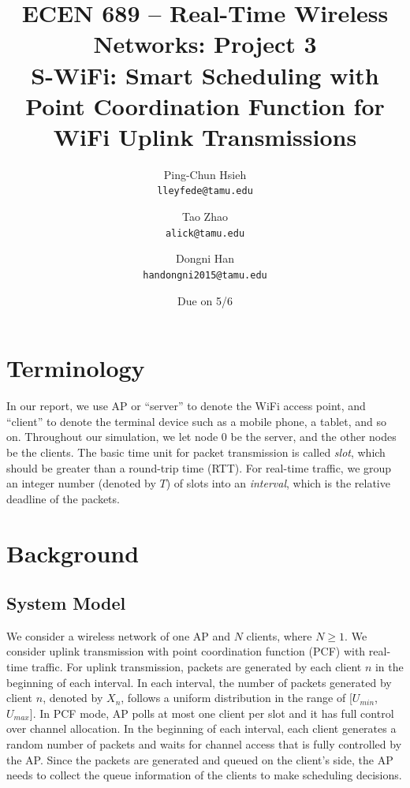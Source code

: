 \documentclass{article}
\begin{document}
\title{\bfseries ECEN 689 -- Real-Time Wireless Networks: Project 3\\
S-WiFi: Smart Scheduling with Point Coordination Function for WiFi Uplink Transmissions}
\date{Due on 5/6}
\author{%
Ping-Chun Hsieh\\
\texttt{lleyfede@tamu.edu}
\and
Tao Zhao\\
\texttt{alick@tamu.edu}
\and
Dongni Han\\
\texttt{handongni2015@tamu.edu}
}
\maketitle

\section*{Terminology}

In our report, we use AP or ``server'' to denote the WiFi access point, and ``client'' to denote the terminal device such as a mobile phone, a tablet, and so on. Throughout our simulation, we let node $0$ be the server, and the other nodes be the clients. The basic time unit for packet transmission is called \emph{slot}, which should be greater than a round-trip time (RTT). For real-time traffic, we group an integer number (denoted by $T$) of slots into an \emph{interval}, which is the relative deadline of the packets.

\section{Background}
\subsection{System Model}
We consider a wireless network of one AP and $N$ clients, where $N\ge1$. We consider uplink transmission with point coordination function (PCF) with real-time traffic. For uplink transmission, packets are generated by each client $n$ in the beginning of each interval. In each interval, the number of packets generated by client $n$, denoted by $X_n$, follows a uniform distribution in the range of [$U_{min}$, $U_{max}$]. In PCF mode, AP polls at most one client per slot and it has full control over channel allocation. In the beginning of each interval, each client generates a random number of packets and waits for channel access that is fully controlled by the AP. Since the packets are generated and queued on the client's side, the AP needs to collect the queue information of the clients to make scheduling decisions.
\end{document}
